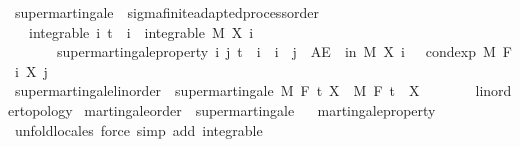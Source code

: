 \begin{isabellebody}
%
\isatagdocument
%
\isamarkuptrue%
%
\endisatagdocument
{\isafolddocument}%
%
\isadelimdocument
%
\endisadelimdocument
{}\isamarkupfalse%
\ supermartingale\ {\isacharequal}{\kern0pt}\ sigma{\isacharunderscore}{\kern0pt}finite{\isacharunderscore}{\kern0pt}adapted{\isacharunderscore}{\kern0pt}process{\isacharunderscore}{\kern0pt}order\ {\isacharplus}{\kern0pt}\isanewline
\ \ \ integrable{\isacharcolon}{\kern0pt}\ {\isachardoublequoteopen}{\isasymAnd}i{\isachardot}{\kern0pt}\ t\ {\isasymle}\ i\ {\isasymLongrightarrow}\ integrable\ M\ {\isacharparenleft}{\kern0pt}X\ i{\isacharparenright}{\kern0pt}{\isachardoublequoteclose}\isanewline
\ \ \ \ \ \ \ supermartingale{\isacharunderscore}{\kern0pt}property{\isacharcolon}{\kern0pt}\ {\isachardoublequoteopen}{\isasymAnd}i\ j{\isachardot}{\kern0pt}\ t\ {\isasymle}\ i\ {\isasymLongrightarrow}\ i\ {\isasymle}\ j\ {\isasymLongrightarrow}\ AE\ {\isasymxi}\ in\ M{\isachardot}{\kern0pt}\ X\ i\ {\isasymxi}\ {\isasymge}\ cond{\isacharunderscore}{\kern0pt}exp\ M\ {\isacharparenleft}{\kern0pt}F\ i{\isacharparenright}{\kern0pt}\ {\isacharparenleft}{\kern0pt}X\ j{\isacharparenright}{\kern0pt}\ {\isasymxi}{\isachardoublequoteclose}\isanewline
\isanewline
{}\isamarkupfalse%
\ supermartingale{\isacharunderscore}{\kern0pt}linorder\ {\isacharequal}{\kern0pt}\ supermartingale\ M\ F\ t\ X\ \ M\ F\ t\ \ X\ {\isacharcolon}{\kern0pt}{\isacharcolon}{\kern0pt}\ {\isachardoublequoteopen}{\isacharunderscore}{\kern0pt}\ {\isasymRightarrow}\ {\isacharunderscore}{\kern0pt}\ {\isasymRightarrow}\ {\isacharunderscore}{\kern0pt}\ {\isacharcolon}{\kern0pt}{\isacharcolon}{\kern0pt}\ {\isacharbraceleft}{\kern0pt}linorder{\isacharunderscore}{\kern0pt}topology{\isacharbraceright}{\kern0pt}{\isachardoublequoteclose}\isanewline
\isanewline
{}\isamarkupfalse%
\ martingale{\isacharunderscore}{\kern0pt}order\ {\isasymsubseteq}\ supermartingale%
\isadelimproof
\ %
\endisadelimproof
%
\isatagproof
{}\isamarkupfalse%
\ martingale{\isacharunderscore}{\kern0pt}property\ \isamarkupfalse%
\ {\isacharparenleft}{\kern0pt}unfold{\isacharunderscore}{\kern0pt}locales{\isacharparenright}{\kern0pt}\ {\isacharparenleft}{\kern0pt}force\ simp\ add{\isacharcolon}{\kern0pt}\ integrable{\isacharparenright}{\kern0pt}{\isacharplus}{\kern0pt}%
\endisatagproof
{\isafoldproof}%
%
\isadelimproof

\end{isabellebody}
